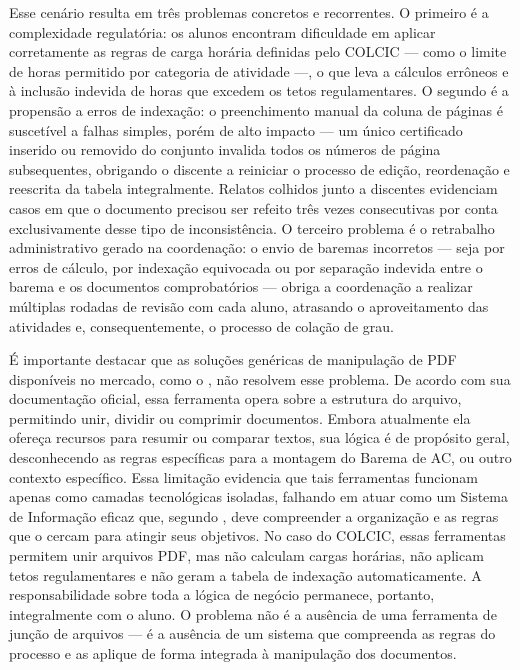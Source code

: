 Esse cenário resulta em três problemas concretos e recorrentes. O primeiro é a complexidade regulatória: os alunos encontram dificuldade em aplicar corretamente as regras de carga horária definidas pelo COLCIC — como o limite de horas permitido por categoria de atividade —, o que leva a cálculos errôneos e à inclusão indevida de horas que excedem os tetos regulamentares. O segundo é a propensão a erros de indexação: o preenchimento manual da coluna de páginas é suscetível a falhas simples, porém de alto impacto — um único certificado inserido ou removido do conjunto invalida todos os números de página subsequentes, obrigando o discente a reiniciar o processo de edição, reordenação e reescrita da tabela integralmente. Relatos colhidos junto a discentes evidenciam casos em que o documento precisou ser refeito três vezes consecutivas por conta exclusivamente desse tipo de inconsistência. O terceiro problema é o retrabalho administrativo gerado na coordenação: o envio de baremas incorretos — seja por erros de cálculo, por indexação equivocada ou por separação indevida entre o barema e os documentos comprobatórios — obriga a coordenação a realizar múltiplas rodadas de revisão com cada aluno, atrasando o aproveitamento das atividades e, consequentemente, o processo de colação de grau.

É importante destacar que as soluções genéricas de manipulação de PDF disponíveis no mercado, como o \cite{ilovepdf2026}, não resolvem esse problema. De acordo com sua documentação oficial, essa ferramenta opera sobre a estrutura do arquivo, permitindo unir, dividir ou comprimir documentos. Embora atualmente ela ofereça recursos para resumir ou comparar textos, sua lógica é de propósito geral, desconhecendo as regras específicas para a montagem do Barema de AC, ou outro contexto específico. Essa limitação evidencia que tais ferramentas funcionam apenas como camadas tecnológicas isoladas, falhando em atuar como um Sistema de Informação eficaz que, segundo \cite{laudon2014}, deve compreender a organização e as regras que o cercam para atingir seus objetivos. No caso do COLCIC, essas ferramentas permitem unir arquivos PDF, mas não calculam cargas horárias, não aplicam tetos regulamentares e não geram a tabela de indexação automaticamente. A responsabilidade sobre toda a lógica de negócio permanece, portanto, integralmente com o aluno. O problema não é a ausência de uma ferramenta de junção de arquivos — é a ausência de um sistema que compreenda as regras do processo e as aplique de forma integrada à manipulação dos documentos.

